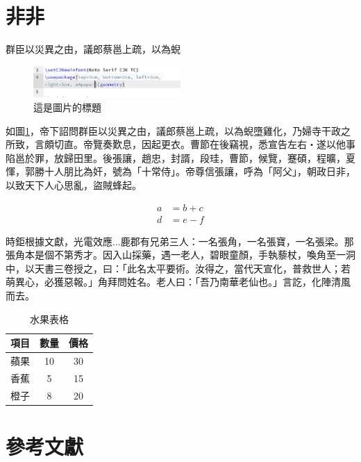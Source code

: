 \documentclass[12pt]{article}
\begin{document}
\section{非非}
\hspace{2em}群臣以災異之由，議郎蔡邕上疏，以為蜺
\begin{figure}[h]
    \centering
    \includegraphics[width=0.5\textwidth]{截圖 2025-01-24 03.21.17.png}  %
    \caption{這是圖片的標題}
    \label{fig:example2}  %
\end{figure}

如圖\ref{fig:example2}，帝下詔問群臣以災異之由，議郎蔡邕上疏，以為蜺墮雞化，乃婦寺干政之所致，言頗切直。帝覽奏歎息，因起更衣。曹節在後竊視，悉宣告左右‧遂以他事陷邕於罪，放歸田里。後張讓，趙忠，封諝，段珪，曹節，候覽，蹇碩，程曠，夏惲，郭勝十人朋比為奸，號為「十常侍」。帝尊信張讓，呼為「阿父」，朝政日非，以致天下人心思亂，盜賊蜂起。

\begin{align}
    a &= b + c \label{eq:1}
    \\
    d &= e - f \label{eq:2}
\end{align}
    
時鉅根據文獻\cite{einstein1905}，光電\cite{latexcompanion}效\cite{鄭智銘2006分散式儲存架構下的遠距環境監測系統之建構}應...鹿郡有兄弟三人：一名張角，一名張寶，一名張梁。那張角本是個不第秀才。因入山採藥，遇一老人，碧眼童顏，手執藜杖，喚角至一洞中，以天書三卷授之，曰：「此名太平要術。汝得之，當代天宣化，普救世人；若萌異心，必獲惡報。」角拜問姓名。老人曰：「吾乃南華老仙也。」言訖，化陣清風而去。

\begin{table}[ht]
    \centering
    \begin{tabular}{|c|c|c|}
    \hline
    項目  & 數量 & 價格 \\
    \hline
    蘋果  & 10  & 30   \\
    香蕉  & 5   & 15   \\
    橙子  & 8   & 20   \\
    \hline
    \end{tabular}
    \caption{水果表格}
    \label{tab:fruits}
\end{table}
\section{參考文獻}
\vspace{-3.5em}  %
\renewcommand{\refname}{}  %
\printbibliography  %
\end{document}

